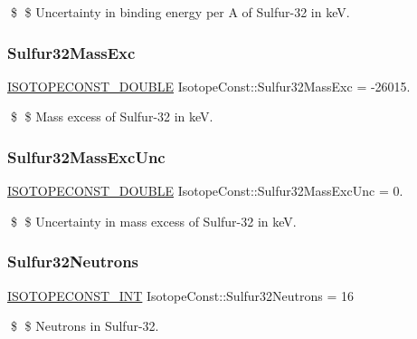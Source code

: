 \$ \$ Uncertainty in binding energy per A of Sulfur-\/32 in keV. \mbox{\label{group___isotope_const-_sulfur-_s32_ga2ccee2aeb37d25cea41a57b6aa2e779b}} 
\subsubsection{\texorpdfstring{Sulfur32\+Mass\+Exc}{Sulfur32MassExc}}
{\footnotesize\ttfamily \mbox{\hyperlink{group___isotope_const-_macros_ga8f45a7272ce02c0b4c65c44636ed719a}{I\+S\+O\+T\+O\+P\+E\+C\+O\+N\+S\+T\+\_\+\+D\+O\+U\+B\+LE}} Isotope\+Const\+::\+Sulfur32\+Mass\+Exc = -\/26015.}

\$ \$ Mass excess of Sulfur-\/32 in keV. \mbox{\label{group___isotope_const-_sulfur-_s32_ga8f64fd2ccbcc64acdda5f3999206ef31}} 
\subsubsection{\texorpdfstring{Sulfur32\+Mass\+Exc\+Unc}{Sulfur32MassExcUnc}}
{\footnotesize\ttfamily \mbox{\hyperlink{group___isotope_const-_macros_ga8f45a7272ce02c0b4c65c44636ed719a}{I\+S\+O\+T\+O\+P\+E\+C\+O\+N\+S\+T\+\_\+\+D\+O\+U\+B\+LE}} Isotope\+Const\+::\+Sulfur32\+Mass\+Exc\+Unc = 0.}

\$ \$ Uncertainty in mass excess of Sulfur-\/32 in keV. \mbox{\label{group___isotope_const-_sulfur-_s32_ga82a374c1a9e206841240c9f3fa28257e}} 
\subsubsection{\texorpdfstring{Sulfur32\+Neutrons}{Sulfur32Neutrons}}
{\footnotesize\ttfamily \mbox{\hyperlink{group___isotope_const-_macros_ga5f18360b3e99483a35c32d789e62621c}{I\+S\+O\+T\+O\+P\+E\+C\+O\+N\+S\+T\+\_\+\+I\+NT}} Isotope\+Const\+::\+Sulfur32\+Neutrons = 16}

\$ \$ Neutrons in Sulfur-\/32. \mbox{\label{group___isotope_const-_sulfur-_s32_ga8c8574f45606428613423e3701081007}} 
